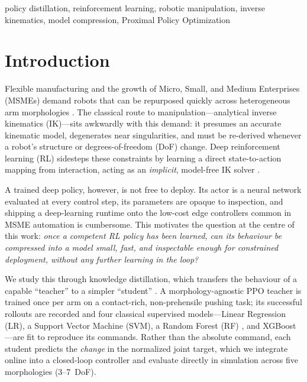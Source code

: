 \documentclass[conference]{IEEEtran}
\begin{document}
\begin{IEEEkeywords}
policy distillation, reinforcement learning, robotic manipulation, inverse
kinematics, model compression, Proximal Policy Optimization
\end{IEEEkeywords}

\section{Introduction}
Flexible manufacturing and the growth of Micro, Small, and Medium Enterprises
(MSMEs) demand robots that can be repurposed quickly across heterogeneous arm
morphologies \cite{kober}. The classical route to manipulation---analytical
inverse kinematics (IK)---sits awkwardly with this demand: it presumes an
accurate kinematic model, degenerates near singularities, and must be re-derived
whenever a robot's structure or degrees-of-freedom (DoF) change. Deep
reinforcement learning (RL) sidesteps these constraints by learning a direct
state-to-action mapping from interaction, acting as an \emph{implicit},
model-free IK solver \cite{lobbezoo_survey, shahid}.

A trained deep policy, however, is not free to deploy. Its actor is a neural
network evaluated at every control step, its parameters are opaque to inspection,
and shipping a deep-learning runtime onto the low-cost edge controllers common in
MSME automation is cumbersome. This motivates the question at the centre of this
work: \emph{once a competent RL policy has been learned, can its behaviour be
compressed into a model small, fast, and inspectable enough for constrained
deployment, without any further learning in the loop?}

We study this through knowledge distillation, which transfers the behaviour of a
capable ``teacher'' to a simpler ``student'' \cite{hinton, rusu}. A
morphology-agnostic PPO teacher \cite{schulman} is trained once per arm on a
contact-rich, non-prehensile pushing task; its successful rollouts are recorded
and four classical supervised models---Linear Regression (LR), a Support Vector
Machine (SVM), a Random Forest (RF) \cite{breiman}, and XGBoost
\cite{xgboost}---are fit to reproduce its commands. Rather than the absolute
command, each student predicts the \emph{change} in the normalized joint target,
which we integrate online into a closed-loop controller and evaluate directly in
simulation across five morphologies (3--7~DoF).
\end{document}

